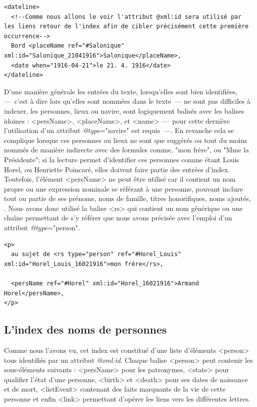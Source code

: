 \documentclass[12pt,a4paper]{book} %
\begin{document}
\begin{lstlisting}
<dateline>
  <!--Comme nous allons le voir l'attribut @xml:id sera utilisé par les liens retour de l'index afin de cibler précisément cette première occurrence-->
  Bord <placeName ref="#Salonique" xml:id="Salonique_21041916">Salonique</placeName>,
  <date when="1916-04-21">le 21. 4. 1916</date>
</dateline>
\end{lstlisting}
\bigskip

D'une manière générale les entrées du texte, lorsqu'elles sont bien identifiées,---~c'est à dire lors qu'elles sont nommées dans le texte~--- ne sont pas difficiles à indexer, les personnes, lieux ou navire, sont logiquement balisés avec les balises idoines : <persName>, <placeName>, et <name> ---~pour cette dernière l'utilisation d'un attribut \textit{@type}="navire" est requis~---. En revanche cela se complique lorsque ces personnes ou lieux ne sont que suggérés ou tout du moins nommés de manière indirecte avec des formules comme, "mon frère", ou "Mme la Présidente"; si la lecture permet d'identifier ces personnes comme étant Louis Horel, ou Henriette Poincaré, elles doivent faire partie des entrées d'index. Toutefois, l'élément <persName> ne peut être utilisé car il \og contient un nom propre ou une expression nominale se référant à une personne, pouvant inclure tout ou partie de ses prénoms, noms de famille, titres honorifiques, noms ajoutés, \fg{}. Nous avons donc utilisé la balise <rs> qui \og contient un nom générique ou une chaîne permettant de s'y référer \fg{} que nous avons précisée avec l'emploi d'un attribut \textit{@type}="person".
\bigskip

\begin{lstlisting}
<p>
  au sujet de <rs type="person" ref="#Horel_Louis" xml:id="Horel_Louis_16021916">mon frère</rs>,

  <persName ref="#Horel" xml:id="Horel_16021916">Armand Horel</persName>,
</p>  
\end{lstlisting} 
\bigskip

\subsection{L'index des noms de personnes}

Comme nous l'avons vu, cet index est constitué d'une liste d'éléments <person> tous identifiés par un attribut \textit{@xml:id}. Chaque balise <person> peut contenir les sous-éléments suivants : <persName> pour les patronymes, <state> pour qualifier l'état d'une personne, <birth> et <death> pour ses dates de naissance et de mort, <listEvent> contenant des faits marquants de la vie de cette personne et enfin <link> permettant d'opérer les liens vers les différentes lettres.
\end{document}
